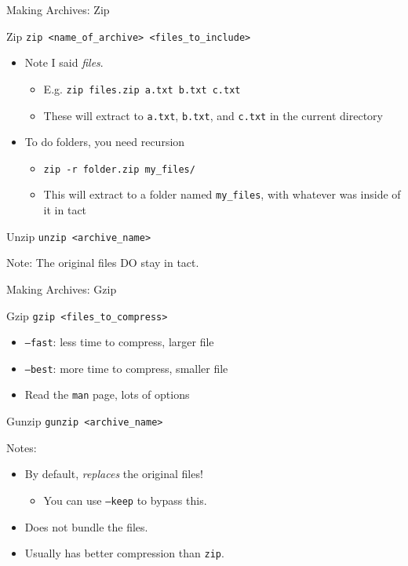 \documentclass[11pt]{beamer}
\newcommand{\colbf}[1]{\textcolor{mLightBrown!77!black}{#1}}%
\begin{document}
\begin{frame}[fragile]{Making Archives: Zip}
  \begin{block}{\colbf{Zip}}
    \texttt{zip <name\_of\_archive> <files\_to\_include>}
    \begin{itemize}
      \item Note I said \emph{files}.
      \begin{itemize}
        \item E.g. \texttt{zip files.zip a.txt b.txt c.txt}
        \item These will extract to \texttt{a.txt}, \texttt{b.txt}, and \texttt{c.txt} in the current directory
      \end{itemize}
        \item To do folders, you need recursion
      \begin{itemize}
        \item \texttt{zip -r folder.zip my\_files/}
        \item This will extract to a folder named \texttt{my\_files}, with whatever was inside of it in tact
      \end{itemize}
    \end{itemize}
  \end{block}
  \begin{block}{\colbf{Unzip}}
    \texttt{unzip <archive\_name>}
  \end{block}
  \colbf{Note}: The original files DO stay in tact.
\end{frame}

\begin{frame}{Making Archives: Gzip}
  \begin{block}{\colbf{Gzip}}
    \texttt{gzip <files\_to\_compress>}
    \begin{itemize}
      \item \texttt{--fast}: less time to compress, larger file
      \item \texttt{--best}: more time to compress, smaller file
      \item Read the \texttt{man} page, lots of options
    \end{itemize}
  \end{block}
  \begin{block}{\colbf{Gunzip}}
    \texttt{gunzip <archive\_name>}
  \end{block}
  \colbf{Notes}:
  \begin{itemize}
    \item By default, \emph{replaces} the original files!
    \begin{itemize}
      \item You can use \texttt{--keep} to bypass this.
    \end{itemize}
    \item Does not bundle the files.
    \item Usually has better compression than \texttt{zip}.
  \end{itemize}
\end{frame}
\end{document}
